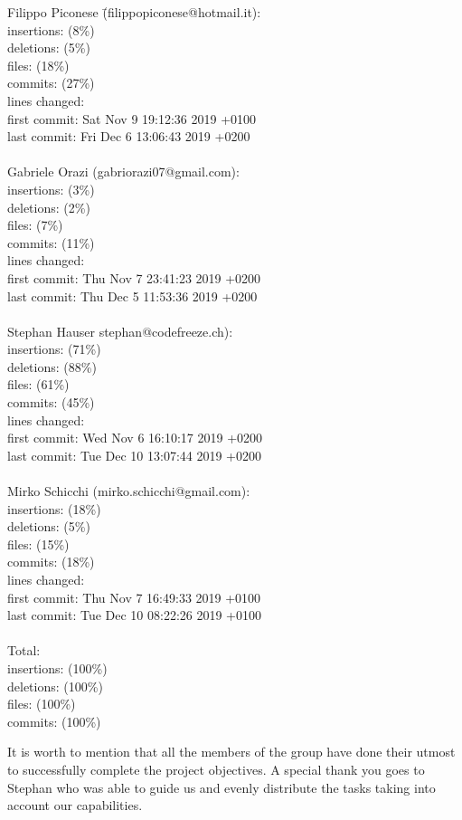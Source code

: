 \begin{tabbing}
  Filippo Piconese \= (filippopiconese@hotmail.it):\\
  insertions:  (8\%)\\
  deletions:  (5\%)\\
  files:  (18\%)\\
  commits:  (27\%)\\
  lines changed: \\
  first commit: \> Sat Nov 9 19:12:36 2019 +0100\\
  last commit: \> Fri Dec 6 13:06:43 2019 +0200\\
  \\
  Gabriele Orazi \> (gabriorazi07@gmail.com):\\
  insertions:  (3\%)\\
  deletions:  (2\%)\\
  files:  (7\%)\\
  commits:  (11\%)\\
  lines changed: \\
  first commit: \> Thu Nov 7 23:41:23 2019 +0200\\
  last commit: \> Thu Dec 5 11:53:36 2019 +0200\\
  \\
  Stephan Hauser \> stephan@codefreeze.ch):\\
  insertions:  (71\%)\\
  deletions:  (88\%)\\
  files:  (61\%)\\
  commits:  (45\%)\\
  lines changed: \\
  first commit: \> Wed Nov 6 16:10:17 2019 +0200\\
  last commit: \> Tue Dec 10 13:07:44 2019 +0200\\
  \\
  Mirko Schicchi \> (mirko.schicchi@gmail.com):\\
  insertions:  (18\%)\\
  deletions:  (5\%)\\
  files:  (15\%)\\
  commits:  (18\%)\\
  lines changed: \\
  first commit: \> Thu Nov 7 16:49:33 2019 +0100\\
  last commit: \> Tue Dec 10 08:22:26 2019 +0100\\
  \\
  Total:\\
  insertions:  (100\%)\\
  deletions:  (100\%)\\
  files:  (100\%)\\
  commits:  (100\%)\\
\end{tabbing}
It is worth to mention that all the members of the group have done their utmost to successfully complete the project objectives.\newline
A special thank you goes to Stephan who was able to guide us and evenly distribute the tasks taking into account our capabilities.
